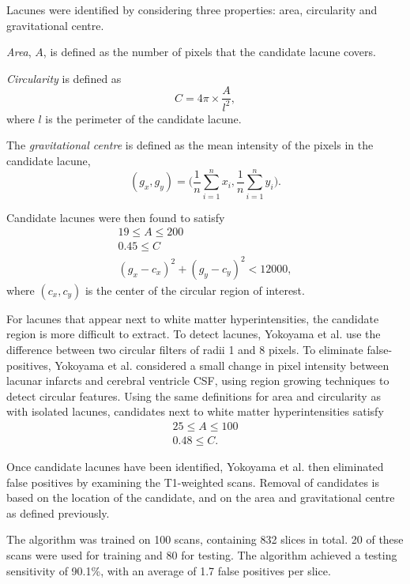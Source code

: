 \documentclass[honours,12pt]{unswthesis}
\numberwithin{equation}{section}
\begin{document}
Lacunes were identified by considering three properties: area, circularity and gravitational centre.

\textit{Area}, $A$, is defined as the number of pixels that the candidate lacune covers. 

\textit{Circularity} is defined as
\[
	C = 4\pi \times \dfrac{A}{l^2},
\]
where $l$ is the perimeter of the candidate lacune.

The \textit{gravitational centre} is defined as the mean intensity of the pixels in the candidate lacune,
\[
	(g_x, g_y) = \bigg(\dfrac{1}{n}\sum_{i=1}^nx_i, \dfrac{1}{n}\sum_{i=1}^ny_i\bigg).
\]


Candidate lacunes were then found to satisfy
\begin{align*}
	19 \le A \le 200 \\
	0.45 \le C \\
	(g_x - c_x)^2 + (g_y - c_y)^2 < 12000,
\end{align*}
where $(c_x, c_y)$ is the center of the circular region of interest.

For lacunes that appear next to white matter hyperintensities, the candidate region is more difficult to extract. To detect lacunes, Yokoyama et al. use the difference between two circular filters of radii 1 and 8 pixels. To eliminate false-positives, Yokoyama et al. considered a small change in pixel intensity between lacunar infarcts and cerebral ventricle CSF, using region growing techniques to detect circular features. Using the same definitions for area and circularity as with isolated lacunes, candidates next to white matter hyperintensities satisfy
\begin{align*}
	25 \le A \le 100 \\
	0.48 \le C.
\end{align*}

Once candidate lacunes have been identified, Yokoyama et al. then eliminated false positives by examining the T1-weighted scans. Removal of candidates is based on the location of the candidate, and on the area and gravitational centre as defined previously.

The algorithm was trained on 100 scans, containing 832 slices in total. 20 of these scans were used for training and 80 for testing. The algorithm achieved a testing sensitivity of 90.1\%, with an average of 1.7 false positives per slice.
\end{document}
